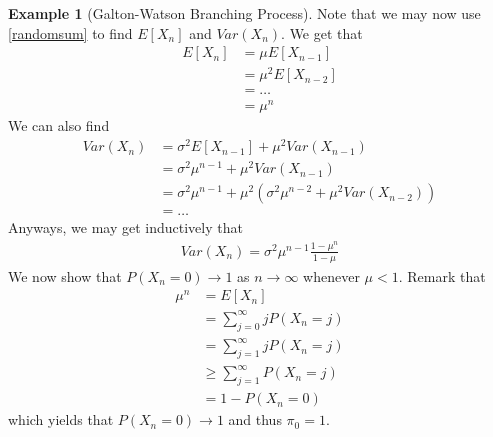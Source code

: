 \documentclass[11pt]{amsart}
\theoremstyle{definition}
\newtheorem{example}[theorem]{Example}
\numberwithin{equation}{section}
\begin{document}
\begin{example}[Galton-Watson Branching Process]
 Note that we may now use \ref{randomsum} to find $E[X_n]$ and $Var(X_n)$. We get that
 \begin{align*}
     E[X_n]&=\mu E[X_{n-1}]\\
     &=\mu^2E[X_{n-2}]\\
     &=\ldots\\
     &=\mu^n
 \end{align*}
 We can also find
 \begin{align*}
     Var(X_n)&=\sigma^2E[X_{n-1}]+\mu^2Var(X_{n-1})\\
     &=\sigma^2\mu^{n-1}+\mu^2Var(X_{n-1})\\
     &=\sigma^2\mu^{n-1}+\mu^2(\sigma^2\mu^{n-2}+\mu^2Var(X_{n-2}))\\
     &=\ldots
 \end{align*}
 Anyways, we may get inductively that 
 \begin{align*}
     Var(X_n)=\sigma^2\mu^{n-1}\frac{1-\mu^n}{1-\mu}
 \end{align*}
 We now show that $P(X_n=0)\to 1$ as $n\to\infty$ whenever $\mu<1$. Remark that
 \begin{align*}
     \mu^n&=E[X_n]\\
     &=\sum_{j=0}^\infty jP(X_n=j)\\
     &=\sum_{j=1}^\infty jP(X_n=j)\\
     &\ge\sum_{j=1}^\infty P(X_n=j)\\
     &=1-P(X_n=0)
 \end{align*}
 which yields that $P(X_n=0)\to 1$ and thus $\pi_0=1$.


\end{example}
\end{document}
